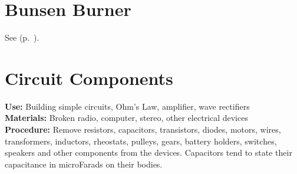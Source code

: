 \begin{multicols}{2}
\section{Bunsen Burner}
\label{sec:bunsen-burner}
See  (p.~\pageref{sec:heatsources}).


\columnbreak

\section{Circuit Components}
\label{sec:circuit-comp}
\vspace{-10pt}
\textbf{Use:} Building simple circuits, Ohm's Law, amplifier, wave rectifiers\\
\textbf{Materials:} Broken radio, computer, stereo, other electrical devices\\
\textbf{Procedure:} Remove resistors, capacitors, transistors, diodes, motors, wires, transformers, inductors, rheostats, pulleys, gears, battery holders, switches, speakers and other components from the devices. Capacitors tend to state their capacitance in microFarads on their bodies.



\end{multicols}
